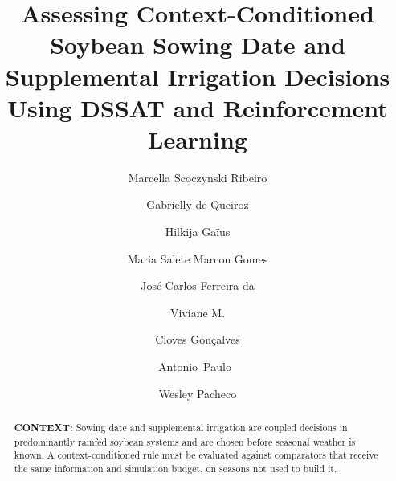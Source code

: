\documentclass[times,final,authoryear]{elsarticle}
\begin{document}

\begin{frontmatter}

\title{Assessing Context-Conditioned Soybean Sowing Date and Supplemental Irrigation Decisions Using DSSAT and Reinforcement Learning}

\author[2,6,7,8]{Marcella  Scoczynski Ribeiro } %
\author[1]{Gabrielly de Queiroz } %
\author[2]{Hilkija Gaïus } %
\author[1,8]{Maria Salete Marcon Gomes } %
\author[1,8]{José Carlos Ferreira da } %
\author[4,5,6]{Viviane M. } %
\author[4]{Cloves Gonçalves } %
\author[3]{Antonio~Paulo~} %
\author[3,5,6]{Wesley Pacheco } %

\address[1]{State University of Ponta Grossa, Ponta Grossa, Parana/Brazil}
\address[2]{Federal University of Technology - Parana, Brazil}
\address[3]{Institute of Systems and Robotics, Coimbra University, Coimbra/Portugal}
\address[4]{Polytechnic and Arts School, Pontifical Catholic University of Goias, Goiania, Goias/Brazil PC~74.605-010}
\address[5]{Electrical, Mechanical \& Computer Engineering School, Federal University of Goias, Goiania, Goias/Brazil PC~74.605-010}
\address[6]{Experimental \& Technological Research and Study Group, Federal Institute of Goias, Goiania, Goias,  Brazil}
\address[7]{Federal University of Technology - Parana, Graduate Program in Electrical Engineering, Ponta Grossa, Brazil}
\address[8]{State University of Ponta Grossa, Postgraduate Program in Applied Computing, Ponta Grossa, Parana/Brazil}



\begin{abstract}
\textbf{CONTEXT:} Sowing date and supplemental irrigation are coupled decisions in predominantly rainfed soybean systems and are chosen before seasonal weather is known. A context-conditioned rule must be evaluated against comparators that receive the same information and simulation budget, on seasons not used to build it.


\end{abstract}
\end{frontmatter}
\end{document}
